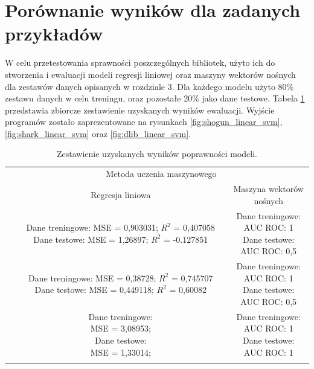\section{Porównanie wyników dla zadanych przykładów}

W celu przetestowania sprawności poszczególnych bibliotek, użyto ich do stworzenia i ewaluacji modeli regresji liniowej oraz maszyny wektorów nośnych dla zestawów danych opisanych w rozdziale 3. Dla każdego modelu użyto 80\% zestawu danych w celu treningu, oraz pozostałe 20\% jako dane testowe. Tabela \ref{tab:models} przedstawia zbiorcze zestawienie uzyskanych wyników ewaluacji. Wyjście programów zostało zaprezentowane na rysunkach \ref{fig:shogun_linear_svm}, \ref{fig:shark_linear_svm} oraz \ref{fig:dlib_linear_svm}.

\newpage
\begin{longtable}{c | c | c }
	\centering
	\multirow{2}{*}{\makecell{Biblioteka}} & \multicolumn{2}{c}{Metoda uczenia maszynowego} \\
	\cline{2-3}
	& Regresja liniowa & Maszyna wektorów nośnych \\
	\hline
	\makecell{Shogun} & \makecell{Dane treningowe: \\ MSE = 0,903031; $R^2$ = 0,407058 \\ Dane testowe: \\ MSE = 1,26897; $R^2$ = -0.127851} & \makecell{Dane treningowe: \\ AUC ROC: 1 \\ Dane testowe: \\ AUC ROC: 0,5} \\
	\hline
	\makecell{Shark} & \makecell{Dane treningowe: \\ MSE = 0,38728; $R^2$ = 0,745707 \\ Dane testowe: \\ MSE = 0,449118; $R^2$ = 0,60082} & \makecell{Dane treningowe: \\ AUC ROC: 1 \\ Dane testowe: \\ AUC ROC: 0,5} \\
	\hline
	\makecell{Dlib} & \makecell{Dane treningowe: \\ MSE = 3,08953; \\ Dane testowe: \\ MSE = 1,33014; } & \makecell{Dane treningowe: \\ AUC ROC: 1 \\ Dane testowe: \\ AUC ROC: 1} \\
	\caption{Zestawienie uzyskanych wyników poprawności modeli.}
	\label{tab:models}
\end{longtable} 

